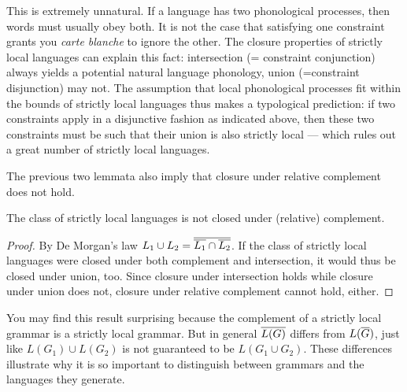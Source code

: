 This is extremely unnatural. If a language has two phonological processes, then words must usually obey both.
It is not the case that satisfying one constraint grants you \emph{carte blanche} to ignore the other.
The closure properties of strictly local languages can explain this fact: intersection (= constraint conjunction) always yields a potential natural language phonology, union (=constraint disjunction) may not.
The assumption that local phonological processes fit within the bounds of strictly local languages thus makes a typological prediction: if two constraints apply in a disjunctive fashion as indicated above, then these two constraints must be such that their union is also strictly local --- which rules out a great number of strictly local languages.
%

The previous two lemmata also imply that closure under relative complement does not hold.
%
\begin{lemma}
    The class of strictly local languages is not closed under (relative) complement.
\end{lemma}
%
\begin{proof}
    By De Morgan's law $L_1 \cup L_2 =  \overline{ \overline{L_1}  \cap  \overline{L_2} } $.
    If the class of strictly local languages were closed under both complement and intersection, it would thus be closed under union, too.
    Since closure under intersection holds while closure under union does not, closure under relative complement cannot hold, either.
\end{proof}
%
You may find this result surprising because the complement of a strictly local grammar is a strictly local grammar.
But in general $ \overline{L(G)} $ differs from $L( \overline{G} )$, just like $L(G_1) \cup L(G_2)$ is not guaranteed to be $L(G_1 \cup G_2)$.
These differences illustrate why it is so important to distinguish between grammars and the languages they generate.

